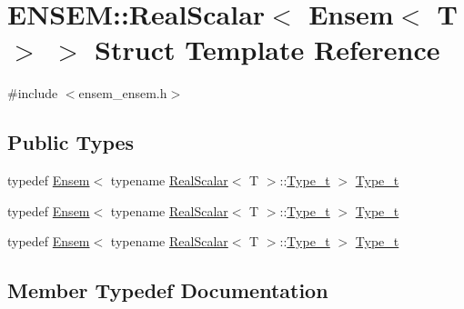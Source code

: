 \hypertarget{structENSEM_1_1RealScalar_3_01Ensem_3_01T_01_4_01_4}{}\section{E\+N\+S\+EM\+:\+:Real\+Scalar$<$ Ensem$<$ T $>$ $>$ Struct Template Reference}
\label{structENSEM_1_1RealScalar_3_01Ensem_3_01T_01_4_01_4}


{\ttfamily \#include $<$ensem\+\_\+ensem.\+h$>$}

\subsection*{Public Types}
\begin{DoxyCompactItemize}
\item 
typedef \mbox{\hyperlink{classENSEM_1_1Ensem}{Ensem}}$<$ typename \mbox{\hyperlink{structENSEM_1_1RealScalar}{Real\+Scalar}}$<$ T $>$\+::\mbox{\hyperlink{structENSEM_1_1RealScalar_3_01Ensem_3_01T_01_4_01_4_a7822ecdfc2f8d6c24460263831283db8}{Type\+\_\+t}} $>$ \mbox{\hyperlink{structENSEM_1_1RealScalar_3_01Ensem_3_01T_01_4_01_4_a7822ecdfc2f8d6c24460263831283db8}{Type\+\_\+t}}
\item 
typedef \mbox{\hyperlink{classENSEM_1_1Ensem}{Ensem}}$<$ typename \mbox{\hyperlink{structENSEM_1_1RealScalar}{Real\+Scalar}}$<$ T $>$\+::\mbox{\hyperlink{structENSEM_1_1RealScalar_3_01Ensem_3_01T_01_4_01_4_a7822ecdfc2f8d6c24460263831283db8}{Type\+\_\+t}} $>$ \mbox{\hyperlink{structENSEM_1_1RealScalar_3_01Ensem_3_01T_01_4_01_4_a7822ecdfc2f8d6c24460263831283db8}{Type\+\_\+t}}
\item 
typedef \mbox{\hyperlink{classENSEM_1_1Ensem}{Ensem}}$<$ typename \mbox{\hyperlink{structENSEM_1_1RealScalar}{Real\+Scalar}}$<$ T $>$\+::\mbox{\hyperlink{structENSEM_1_1RealScalar_3_01Ensem_3_01T_01_4_01_4_a7822ecdfc2f8d6c24460263831283db8}{Type\+\_\+t}} $>$ \mbox{\hyperlink{structENSEM_1_1RealScalar_3_01Ensem_3_01T_01_4_01_4_a7822ecdfc2f8d6c24460263831283db8}{Type\+\_\+t}}
\end{DoxyCompactItemize}


\subsection{Member Typedef Documentation}
\mbox{\label{structENSEM_1_1RealScalar_3_01Ensem_3_01T_01_4_01_4_a7822ecdfc2f8d6c24460263831283db8}} 
